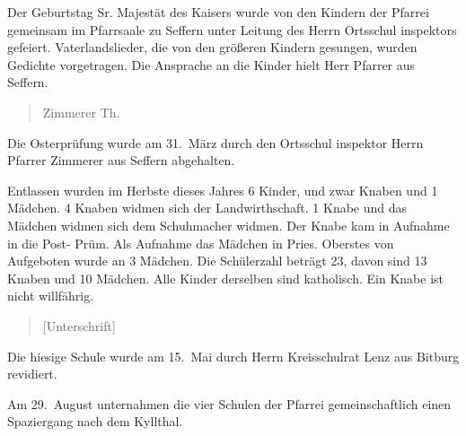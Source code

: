 

\pstart
Der Geburtstag Sr. Majestät des Kaisers wurde von den Kindern der Pfarrei\ob
gemeinsam im Pfarrsaale zu Seffern unter Leitung des Herrn Ortsschul\ohb
inspektors gefeiert. Vaterlandslieder, die von den größeren Kindern\ob
gesungen, wurden Gedichte vorgetragen. Die Ansprache an die Kinder\ob
hielt Herr Pfarrer aus Seffern.

\pend
{}
\pstart


\pend
\begin{verse}
Zimmerer Th.
\end{verse}
\pstart

\pend
{}
\pstart

Die Osterprüfung wurde am 31.\ März durch den Ortsschul\ohb
inspektor Herrn Pfarrer Zimmerer aus Seffern abgehalten.

\pend
{}
\pstart

Entlassen wurden im Herbste dieses Jahres 6 Kinder, und zwar Knaben und 1 Mädchen. 4 Knaben widmen sich der\ob
Landwirthschaft. 1 Knabe und das Mädchen widmen sich dem\unsicher\ob
Schuhmacher\unsicher{} widmen. Der Knabe kam in Aufnahme in die\ob
Post- Prüm. Als Aufnahme\unsicher{} das Mädchen in Pries.\unsicher{} Oberstes\unsicher\ob
von Aufgeboten\unsicher{} wurde an 3 Mädchen. Die Schülerzahl\ob
beträgt 23, davon sind 13 Knaben und 10 Mädchen. Alle Kinder\ob
derselben sind katholisch. Ein Knabe ist nicht willfährig.

\pend
{}
\pstart


\pend
\begin{verse}
{[Unterschrift]}
\end{verse}
\pstart

\pend
{}
\pstart

Die hiesige Schule wurde am 15.\ Mai durch Herrn Kreisschulrat Lenz aus\ob
Bitburg revidiert.

\pend
{}
\pstart

Am 29.\ August unternahmen die vier Schulen der Pfarrei\ob
gemeinschaftlich einen Spaziergang nach dem Kyllthal\unsicher.
\pend

